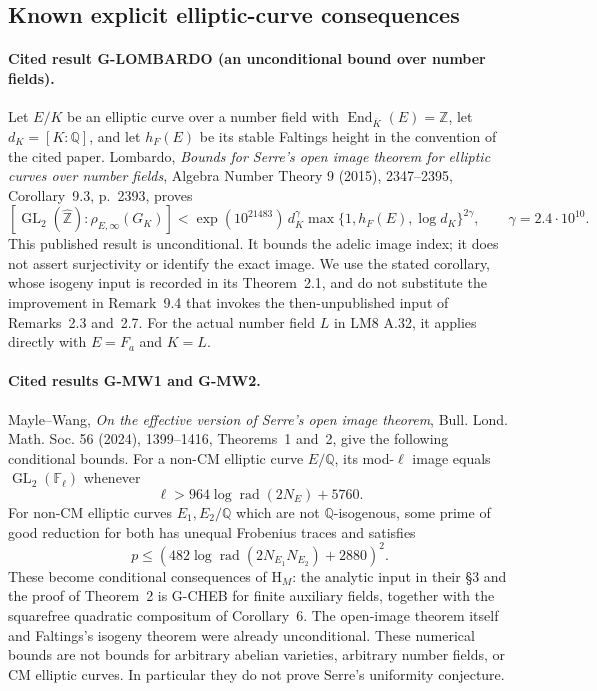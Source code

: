 \subsection{Known explicit elliptic-curve consequences}

\paragraph{Cited result G-LOMBARDO (an unconditional bound over number fields).}
Let $E/K$ be an elliptic curve over a number field with
$\operatorname{End}_{\overline K}(E)=\mathbb Z$, let $d_K=[K:\mathbb Q]$,
and let $h_F(E)$ be its stable Faltings height in the convention of the
cited paper.  Lombardo, \emph{Bounds for Serre's open image theorem for
elliptic curves over number fields}, Algebra Number Theory 9 (2015),
2347--2395, Corollary~9.3, p.~2393, proves
\[
 [\operatorname{GL}_2(\widehat{\mathbb Z}):\rho_{E,\infty}(G_K)]
 < \exp(10^{21483})\,d_K^{\gamma}
       \max\{1,h_F(E),\log d_K\}^{2\gamma},
 \qquad \gamma=2.4\cdot10^{10}. \tag{G-LOMBARDO}
\]
This published result is unconditional. It bounds the adelic image index;
it does not assert surjectivity or identify the exact image. We use the
stated corollary, whose isogeny input is recorded in its Theorem~2.1,
and do not substitute the improvement in Remark~9.4 that invokes the
then-unpublished input of Remarks~2.3 and~2.7. For the actual number
field $L$ in LM8 A.32, it applies directly with $E=F_a$ and $K=L$.

\paragraph{Cited results G-MW1 and G-MW2.}
Mayle--Wang, \emph{On the effective version of Serre's open image theorem}, Bull. Lond. Math. Soc. 56 (2024), 1399--1416, Theorems~1 and~2, give the following conditional bounds. For a non-CM elliptic curve $E/\mathbb Q$, its mod-$\ell$ image equals $\operatorname{GL}_2(\mathbb F_\ell)$ whenever
\[
 \ell>964\log\operatorname{rad}(2N_E)+5760.
 \tag{G-MW1}
\]
For non-CM elliptic curves $E_1,E_2/\mathbb Q$ which are not $\mathbb Q$-isogenous, some prime of good reduction for both has unequal Frobenius traces and satisfies
\[
 p\le\left(482\log\operatorname{rad}(2N_{E_1}N_{E_2})+2880\right)^2.
 \tag{G-MW2}
\]
These become conditional consequences of $\mathrm{H}_M$: the analytic input in their \S3 and the proof of Theorem~2 is G-CHEB for finite auxiliary fields, together with the squarefree quadratic compositum of Corollary~6. The open-image theorem itself and Faltings's isogeny theorem were already unconditional. These numerical bounds are not bounds for arbitrary abelian varieties, arbitrary number fields, or CM elliptic curves. In particular they do not prove Serre's uniformity conjecture.

